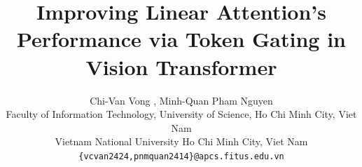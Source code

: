 \documentclass[10pt,twocolumn,letterpaper]{article}
\title{Improving Linear Attention's Performance via Token Gating in Vision Transformer}
\author{Chi-Van Vong \orcidlink{0009-0001-8988-4791}, Minh-Quan Pham Nguyen \orcidlink{0009-0003-7063-3575}\\
Faculty of Information Technology, University of Science, Ho Chi Minh City, Viet Nam\\
Vietnam National University Ho Chi Minh City, Viet Nam\\
{\tt\small \{vcvan2424,pnmquan2414\}@apcs.fitus.edu.vn}
}
\begin{document}
\maketitle







{
	\small
	
	
}

% 
\end{document}

